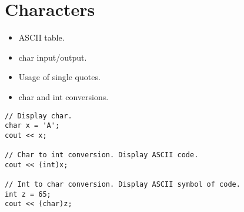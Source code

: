 \documentclass[12pt,a4paper]{article}
\begin{document}
\section{Characters}
\begin{itemize}
\item ASCII table.
\item char input/output.
\item Usage of single quotes.
\item char and int conversions.
\end{itemize}
\begin{lstlisting}
// Display char.
char x = 'A';
cout << x;

// Char to int conversion. Display ASCII code.
cout << (int)x;

// Int to char conversion. Display ASCII symbol of code.
int z = 65;
cout << (char)z;
\end{lstlisting}
\end{document}
